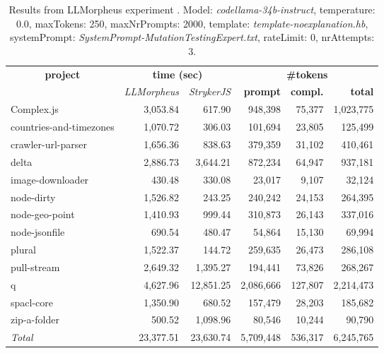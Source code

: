 
\begin{table*}[hbt!]
\centering
{\scriptsize
\begin{tabular}{l||r|r|r|r|r}
\multicolumn{1}{c|}{\bf project} & \multicolumn{2}{|c|}{\bf time (sec)} & \multicolumn{3}{|c|}{\bf \#tokens} \\
               & {\it LLMorpheus} & {\it StrykerJS} & {\bf prompt} & {\bf compl.} & {\bf total} \\
\hline
  Complex.js & 3,053.84 & 617.90 & 948,398 & 75,377 & 1,023,775 \\ 
countries-and-timezones & 1,070.72 & 306.03 & 101,694 & 23,805 & 125,499 \\ 
crawler-url-parser & 1,656.36 & 838.63 & 379,359 & 31,102 & 410,461 \\ 
delta & 2,886.73 & 3,644.21 & 872,234 & 64,947 & 937,181 \\ 
image-downloader & 430.48 & 330.08 & 23,017 & 9,107 & 32,124 \\ 
node-dirty & 1,526.82 & 243.25 & 240,242 & 24,153 & 264,395 \\ 
node-geo-point & 1,410.93 & 999.44 & 310,873 & 26,143 & 337,016 \\ 
node-jsonfile & 690.54 & 480.47 & 54,864 & 15,130 & 69,994 \\ 
plural & 1,522.37 & 144.72 & 259,635 & 26,473 & 286,108 \\ 
pull-stream & 2,649.32 & 1,395.27 & 194,441 & 73,826 & 268,267 \\ 
q & 4,627.96 & 12,851.25 & 2,086,666 & 127,807 & 2,214,473 \\ 
spacl-core & 1,350.90 & 680.52 & 157,479 & 28,203 & 185,682 \\ 
zip-a-folder & 500.52 & 1,098.96 & 80,546 & 10,244 & 90,790 \\ 
\hline
  \textit{Total} & 23,377.51 & 23,630.74 & 5,709,448 & 536,317 & 6,245,765 \\
  \end{tabular}
  }
  \\[2mm]
  \caption{Results from LLMorpheus experiment .
    Model: \textit{codellama-34b-instruct}, 
    temperature: 0.0, 
    maxTokens: 250, 
    maxNrPrompts: 2000, 
    template: \textit{template-noexplanation.hb}, 
    systemPrompt: \textit{SystemPrompt-MutationTestingExpert.txt}, 
    rateLimit: 0, 
    nrAttempts: 3.  
  }
  \label{table:Cost:run376:codellama-34b-instruct:template-noexplanation.hb:0.0}
\end{table*}